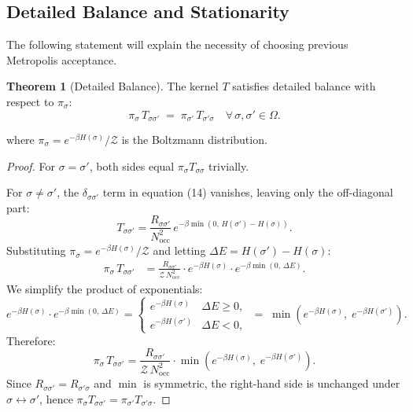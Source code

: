 \documentclass[12pt, a4paper]{article}
\theoremstyle{definition}
\newtheorem{theorem}{Theorem}[section]
\newcommand{\betaT}{\beta}
\newcommand{\ZZ}{\mathcal{Z}}
\begin{document}
\subsection{Detailed Balance and Stationarity}

\hfill

The following statement will explain the necessity of choosing previous Metropolis acceptance.


\begin{theorem}[Detailed Balance]
    The kernel $T$ satisfies detailed balance with respect to
    $\pi_{\sigma}$:
    \begin{equation}
        \pi_{\sigma}\,T_{\sigma \sigma'}
        \;=\;
        \pi_{\sigma'}\,T_{\sigma' \sigma}
        \quad \forall\,\sigma, \sigma' \in \Omega.
        \label{eq:detailed_balance}
    \end{equation}
    
    where $\pi_{\sigma} = e^{-\betaT H(\sigma)}/\ZZ$ is the Boltzmann distribution.
\end{theorem}

\begin{proof}
For $\sigma = \sigma'$, both sides equal $\pi_\sigma T_{\sigma\sigma}$
trivially.

For $\sigma \neq \sigma'$, the $\delta_{\sigma\sigma'}$ term in
equation (14) vanishes, leaving only the off-diagonal part:
\[
    T_{\sigma\sigma'} = \frac{R_{\sigma\sigma'}}{N_{\mathrm{occ}}^2}
    \, e^{-\beta\min(0,\, H(\sigma')-H(\sigma))}.
\]
Substituting $\pi_\sigma = e^{-\beta H(\sigma)}/\mathcal{Z}$ and letting
$\Delta E = H(\sigma') - H(\sigma)$:
\begin{align*}
    \pi_\sigma\, T_{\sigma\sigma'}
    &= \frac{R_{\sigma\sigma'}}{\mathcal{Z}\,N_{\mathrm{occ}}^2}
       \cdot e^{-\beta H(\sigma)} \cdot e^{-\beta\min(0,\,\Delta E)}.
\end{align*}
We simplify the product of exponentials:
\[
    e^{-\beta H(\sigma)} \cdot e^{-\beta\min(0,\,\Delta E)}
    = \begin{cases}
        e^{-\beta H(\sigma)}  & \Delta E \geq 0, \\[4pt]
        e^{-\beta H(\sigma')} & \Delta E < 0,
      \end{cases}
    \;=\; \min\!\left(e^{-\beta H(\sigma)},\; e^{-\beta H(\sigma')}\right).
\]
Therefore:
\[
    \pi_\sigma\, T_{\sigma\sigma'}
    = \frac{R_{\sigma\sigma'}}{\mathcal{Z}\,N_{\mathrm{occ}}^2}
      \cdot \min\!\left(e^{-\beta H(\sigma)},\; e^{-\beta H(\sigma')}\right).
\]
Since $R_{\sigma\sigma'} = R_{\sigma'\sigma}$ and $\min$ is symmetric,
the right-hand side is unchanged under $\sigma \leftrightarrow \sigma'$,
hence $\pi_\sigma T_{\sigma\sigma'} = \pi_{\sigma'} T_{\sigma'\sigma}$.
\end{proof}
\end{document}
